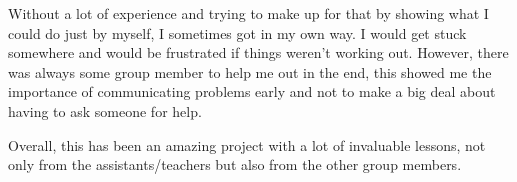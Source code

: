 \documentclass[10pt,a4paper]{article}
\begin{document}
Without a lot of experience and trying to make up for that by showing what I could do just by myself, I sometimes got in my own way. I would get stuck somewhere and would be frustrated if things weren't working out. However, there was always some group member to help me out in the end, this showed me the importance of communicating problems early and not to make a big deal about having to ask someone for help.

Overall, this has been an amazing project with a lot of invaluable lessons, not only from the assistants/teachers but also from the other group members.\\
\\
\end{document}
